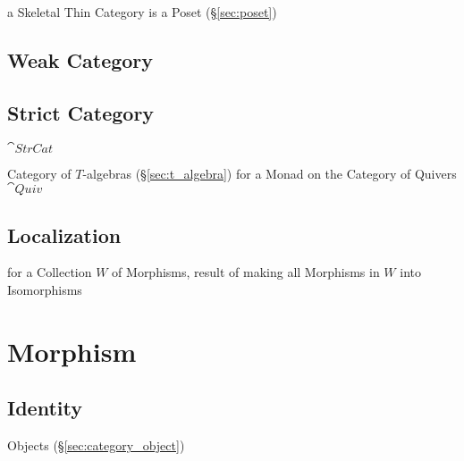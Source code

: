 a Skeletal Thin Category is a Poset (\S\ref{sec:poset})



\subsection{Weak Category}\label{sec:weak_category}

\subsection{Strict Category}\label{sec:strict_category}

$\cat{StrCat}$

Category of $T$-algebras (\S\ref{sec:t_algebra}) for a Monad on the
Category of Quivers $\cat{Quiv}$



\subsection{Localization}\label{sec:category_localization}

for a Collection $W$ of Morphisms, result of making all Morphisms in
$W$ into Isomorphisms




\section{Morphism}\label{sec:morphism}

\subsection{Identity}\label{sec:identity_morphism}

Objects (\S\ref{sec:category_object})



